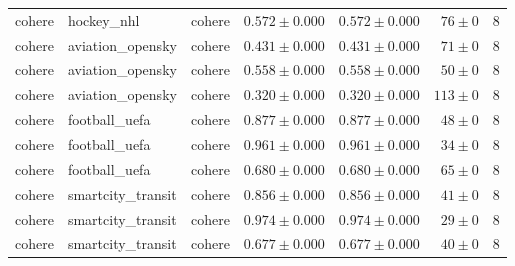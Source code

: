 \begin{table}[htbp]
\begin{tabular}{l l l r r r r}
cohere & hockey\_nhl & cohere & $0.572\pm0.000$ & $0.572\pm0.000$ & $76\pm0$ & 8 \\
cohere & aviation\_opensky & cohere & $0.431\pm0.000$ & $0.431\pm0.000$ & $71\pm0$ & 8 \\
cohere & aviation\_opensky & cohere & $0.558\pm0.000$ & $0.558\pm0.000$ & $50\pm0$ & 8 \\
cohere & aviation\_opensky & cohere & $0.320\pm0.000$ & $0.320\pm0.000$ & $113\pm0$ & 8 \\
cohere & football\_uefa & cohere & $0.877\pm0.000$ & $0.877\pm0.000$ & $48\pm0$ & 8 \\
cohere & football\_uefa & cohere & $0.961\pm0.000$ & $0.961\pm0.000$ & $34\pm0$ & 8 \\
cohere & football\_uefa & cohere & $0.680\pm0.000$ & $0.680\pm0.000$ & $65\pm0$ & 8 \\
cohere & smartcity\_transit & cohere & $0.856\pm0.000$ & $0.856\pm0.000$ & $41\pm0$ & 8 \\
cohere & smartcity\_transit & cohere & $0.974\pm0.000$ & $0.974\pm0.000$ & $29\pm0$ & 8 \\
cohere & smartcity\_transit & cohere & $0.677\pm0.000$ & $0.677\pm0.000$ & $40\pm0$ & 8 \\
\hline
\end{tabular}
\end{table}
